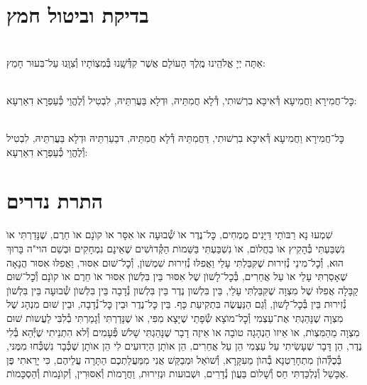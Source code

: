 \documentclass[twoside, openany, parskip=half, 11pt]{book}
\begin{document}
\chapter[בדיקת וביטול חמץ]{ בדיקת וביטול חמץ }

\\
אַתָּה יְיָ אֱלֹהֵֽינוּ מֶֽלֶךְ הָעוֹלָם אֲשֶׁר קִדְּ֯שָֽׁנוּ בְּ֯מִצְוֹתָיו וְ֯צִוָּֽנוּ עַל־בִּעוּר חָמֵץ:


\\
כׇּל־חֲמִירָא וַחֲמִיעָא דְּ֯אִיכָּא בִרְשׁוּתִי, דְּ֯לָא חֲמִתֵּיהּ, וּדְלָא בַּעֲרִתֵּיהּ, לִבְטִיל וְ֯לֶהֱוֵי כְּ֯עַפְרָא דִאַרְעָא:


\\
כׇּל־חֲמִירָא וַחֲמִיעָא דְּ֯אִיכָּא בִרְשׁוּתִי, דַּחֲמִתֵּיהּ דְּ֯לָא חֲמִתֵּיהּ, דּבַעַרִתֵּיהּ וּדְלָא בַּעֲרִתֵּיהּ, לִבְטִיל וְ֯לֶהֱוֵי כְּ֯עַפְרָא דִאַרְעָא:



\chapter[התרת נדרים]{ התרת נדרים }


שִׁמְעוּ נָא רַבּוׂתַי דַּיָּנִים מֻמְחִים, כׇּל־נֶדֶר אוׂ שְׁ֯בוּעָה אוׂ אִסָּר אוׂ קוׂנָם אוׂ חֵרֶם, שֶׁנָּדַרְתִּי אוׂ נִשְׁבַּעְתִּי בְּ֯הָקִיץ אוׂ בַחֲלוׂם, אוׂ נִשְׁבַּעְתִּי בַּשֵּׁמוׂת הַקְּ֯דוׂשִׁים שֶׁאֵינָם נִמְחָקִים וּבְשֵׁם הוי"ה בָּרוּךְ הוּא, וְ֯כׇל־מִינֵי נְ֯זִירוּת שֶׁקִּבַּלְתִּי עָלַי וַאֲפִלּוּ נְ֯זִירוּת שִׁמְשׁוׂן, וְ֯כׇל־שׁוּם אִסּוּר, וַאֲפִלּוּ אִסּוּר הֲנָאָה שֶׁאָסַרְתִּי עָלַי אוׂ עַל אֲחֵרִים, בְּ֯כׇל־לָשׁוׂן שֶׁל אִסּוּר בֵּין בִּלְשׁוׂן אִסּוּר אוׂ חֵרֶם אוׂ קוׂנָם וְ֯כׇל־שׁוּם קַבָּלָה אֲפִלּוּ שֶׁל מִצְוָה שֶׁקִּבַּלְתִּי עָלַי, בֵּין בִּלְשׁון נֶדֶר בֵּין בִּלְשׁון נְ֯דָבָה בֵּין בִּלְשׁוׂן שְׁ֯בוּעָה בֵּין בִּלְשׁוׂן נְ֯זִירוּת בֵּין בְּ֯כׇל־לָשׁוׂן, וְ֯גַם הַנַּעֲשֶׂה בִּתְקִיעַת כָּף. בֵּין כׇּל־נֶדֶר וּבֵין כׇּל־נְ֯דָבָה, וּבֵין שׁוּם מִנְהָג שֶׁל מִצְוָה שֶׁנָּהַגְתִּי אֶת־עַצְמִי וְ֯כׇל־מוׂצָא שְׂ֯פָתַי שֶׁיָּצָא מִפִּי, אוׂ שֶׁנָּדַרְתִּי וְ֯גָמַרְתִּי בְ֯לִבִּי לַעֲשוׂת שׁוּם מִצְוָה מֵהַמִּצְוׂת, אוׂ אֵיזוׂ הַנְהָגָה טוׂבָה אוׂ אֵיזֶה דָבָר שֶׁנָּהַגְתִּי שָׁלשׁ פְּ֯עָמִים וְ֯לא הִתְנֵיתִי שֶׁיְּ֯הֵא בְּ֯לִי נֶדֶר, הֵן דָּבָר שֶׁעָשִׂיתִי עַל עַצְמִי הֵן עַל אֲחֵרִים, הֵן אוׂתָן הַיְדוּעִים לִי הֵן אוׂתָן שֶׁכְּ֯בָר נִשְׁכְּ֯חוּ מִמֶּנּי, בְּ֯כֻלְּ֯הוׂן מִתְחָרַטְנָא בְ֯הוׂן מֵעִקָּרָא, וְ֯שׁוׂאֵל וּמְבַקֵּשׁ אֲנִי מִמַּעֲלַתְכֶם הַתָּרָה עֲלֵיהֶם, כִּי יָרֵאתִי פֶּן אֶכָּשֵׁל וְ֯נִלְכַּדְתִּי חַס וְ֯שָׁלוׂם בַּעֲוׂן נְ֯דָרִים, וּשְׁבוּעות וּנְזִירוּת, וַחֲרָמוׂת וְ֯אִסּוּרִין, וְ֯קוׂנָמוׂת וְ֯הַסְכָּמוׂת.
\end{document}

